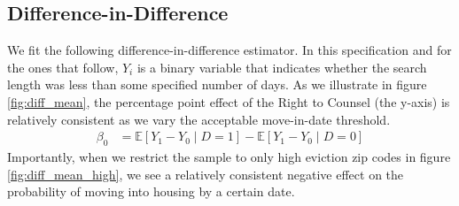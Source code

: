 \documentclass[a4paper,12pt]{article}
\begin{document}
\subsection{Difference-in-Difference}
We fit the following difference-in-difference estimator. In this specification and for the ones that follow, $Y_i$ is a binary variable that indicates whether the search length was less than some specified number of days. As we illustrate in figure \ref{fig:diff_mean}, the percentage point effect of the Right to Counsel (the y-axis) is relatively consistent as we vary the acceptable move-in-date threshold. 
\begin{align*}
    \beta_0 &= \mathbb{E}[Y_1 -Y_0 \mid D=1] -  \mathbb{E}[Y_1 - Y_0 \mid D=0] \end{align*}
Importantly, when we restrict the sample to only high eviction zip codes in figure \ref{fig:diff_mean_high}, we see a relatively consistent negative effect on the probability of moving into housing by a certain date.
\end{document}
